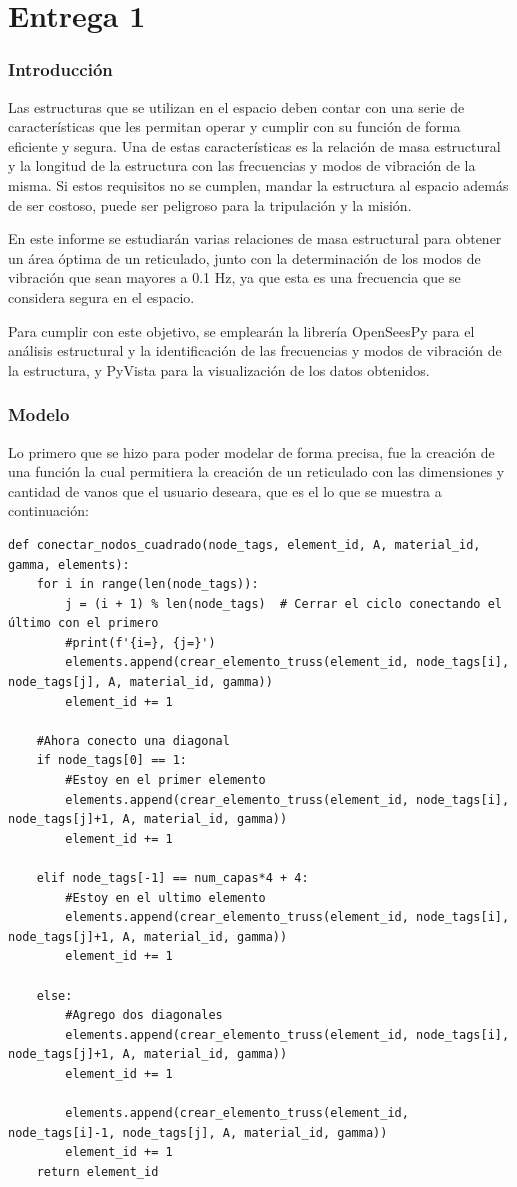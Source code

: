 \part{Entrega 1}


\section{Introducción}
Las estructuras que se utilizan en el espacio deben contar con una serie de características que les permitan operar y cumplir con su función de forma eficiente y segura. Una de estas características es la relación de masa estructural y la longitud de la estructura con las frecuencias y modos de vibración de la misma. Si estos requisitos no se cumplen, mandar la estructura al espacio además de ser costoso, puede ser peligroso para la tripulación y la misión.

En este informe se estudiarán varias relaciones de masa estructural para obtener un área óptima de un reticulado, junto con la determinación de los modos de vibración que sean mayores a 0.1 Hz, ya que esta es una frecuencia que se considera segura en el espacio.

Para cumplir con este objetivo, se emplearán la librería OpenSeesPy para el análisis estructural y la identificación de las frecuencias y modos de vibración de la estructura, y PyVista para la visualización de los datos obtenidos.
\newpage
\section{Modelo}
Lo primero que se hizo para poder modelar de forma precisa, fue la creación de una función la cual permitiera la creación de un reticulado con las dimensiones y cantidad de vanos que el usuario deseara, que es el lo que se muestra a continuación:

\begin{lstlisting}
def conectar_nodos_cuadrado(node_tags, element_id, A, material_id, gamma, elements):
    for i in range(len(node_tags)):
        j = (i + 1) % len(node_tags)  # Cerrar el ciclo conectando el último con el primero
        #print(f'{i=}, {j=}')
        elements.append(crear_elemento_truss(element_id, node_tags[i], node_tags[j], A, material_id, gamma))
        element_id += 1

    #Ahora conecto una diagonal
    if node_tags[0] == 1:
        #Estoy en el primer elemento
        elements.append(crear_elemento_truss(element_id, node_tags[i], node_tags[j]+1, A, material_id, gamma))
        element_id += 1

    elif node_tags[-1] == num_capas*4 + 4:
        #Estoy en el ultimo elemento
        elements.append(crear_elemento_truss(element_id, node_tags[i], node_tags[j]+1, A, material_id, gamma))
        element_id += 1

    else:
        #Agrego dos diagonales
        elements.append(crear_elemento_truss(element_id, node_tags[i], node_tags[j]+1, A, material_id, gamma))
        element_id += 1

        elements.append(crear_elemento_truss(element_id, node_tags[i]-1, node_tags[j], A, material_id, gamma))
        element_id += 1
    return element_id
\end{lstlisting}

